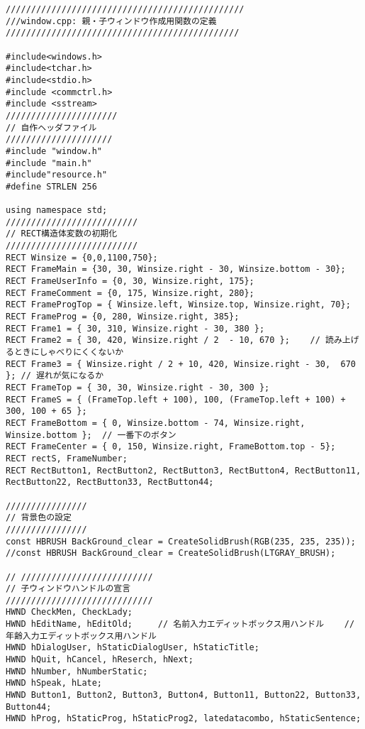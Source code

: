 \begin{lstlisting}[caption=window.cpp]
  ///////////////////////////////////////////////
///window.cpp: 親・子ウィンドウ作成用関数の定義
//////////////////////////////////////////////

#include<windows.h>
#include<tchar.h>
#include<stdio.h>
#include <commctrl.h> 
#include <sstream>
//////////////////////
// 自作ヘッダファイル
/////////////////////
#include "window.h"
#include "main.h"
#include"resource.h"
#define STRLEN 256

using namespace std;
//////////////////////////
// RECT構造体変数の初期化
//////////////////////////
RECT Winsize = {0,0,1100,750};
RECT FrameMain = {30, 30, Winsize.right - 30, Winsize.bottom - 30};
RECT FrameUserInfo = {0, 30, Winsize.right, 175};
RECT FrameComment = {0, 175, Winsize.right, 280};
RECT FrameProgTop = { Winsize.left, Winsize.top, Winsize.right, 70};
RECT FrameProg = {0, 280, Winsize.right, 385};
RECT Frame1 = { 30, 310, Winsize.right - 30, 380 };
RECT Frame2 = { 30, 420, Winsize.right / 2  - 10, 670 };    // 読み上げるときにしゃべりにくくないか
RECT Frame3 = { Winsize.right / 2 + 10, 420, Winsize.right - 30,  670 }; // 遅れが気になるか
RECT FrameTop = { 30, 30, Winsize.right - 30, 300 };
RECT FrameS = { (FrameTop.left + 100), 100, (FrameTop.left + 100) + 300, 100 + 65 };
RECT FrameBottom = { 0, Winsize.bottom - 74, Winsize.right,  Winsize.bottom };  // 一番下のボタン
RECT FrameCenter = { 0, 150, Winsize.right, FrameBottom.top - 5};
RECT rectS, FrameNumber;
RECT RectButton1, RectButton2, RectButton3, RectButton4, RectButton11, RectButton22, RectButton33, RectButton44;

////////////////
// 背景色の設定
////////////////
const HBRUSH BackGround_clear = CreateSolidBrush(RGB(235, 235, 235));
//const HBRUSH BackGround_clear = CreateSolidBrush(LTGRAY_BRUSH);

// //////////////////////////
// 子ウィンドウハンドルの宣言
/////////////////////////////
HWND CheckMen, CheckLady;      
HWND hEditName, hEditOld;     // 名前入力エディットボックス用ハンドル    // 年齢入力エディットボックス用ハンドル
HWND hDialogUser, hStaticDialogUser, hStaticTitle;
HWND hQuit, hCancel, hReserch, hNext;
HWND hNumber, hNumberStatic;
HWND hSpeak, hLate;
HWND Button1, Button2, Button3, Button4, Button11, Button22, Button33, Button44;
HWND hProg, hStaticProg, hStaticProg2, latedatacombo, hStaticSentence;


\end{lstlisting}
